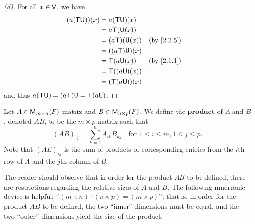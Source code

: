 \begin{proof}[(d)]
	For all \(x \in \mathsf{V}\), we have
	\begin{align*}
		(a (\T \U))(x) & = a (\T \U)(x)                   \\
		               & = a \T(\U(x))                    \\
		               & = (a \T)(\U(x))  &  & \by{2.2.5} \\
		               & = ((a \T) \U)(x)                 \\
		               & = \T(a \U(x))    &  & \by{2.1.1} \\
		               & = \T((a \U)(x))                  \\
		               & = (\T (a \U))(x)
	\end{align*}
	and thus \(a (\mathsf{T} \mathsf{U}) = (a \mathsf{T}) \mathsf{U} = \mathsf{T} (a \mathsf{U})\).
\end{proof}

\begin{defn}\label{2.3.1}
	Let \(A \in \ms\) matrix and \(B \in \ms[n][p][\F]\).
	We define the \textbf{product} of \(A\) and \(B\), denoted \(AB\), to be the \(m \times p\) matrix such that
	\[
		(AB)_{i j} = \sum_{k = 1}^n A_{i k} B_{k j} \quad \text{for } 1 \leq i \leq m, 1 \leq j \leq p.
	\]
	Note that \((AB)_{i j}\) is the sum of products of corresponding entries from the \(i\)th row of \(A\) and the \(j\)th column of \(B\).
\end{defn}

\begin{note}
	The reader should observe that in order for the product \(AB\) to be defined, there are restrictions regarding the relative sizes of \(A\) and \(B\).
	The following mnemonic device is helpful:
	``\((m \times n) \cdot (n \times p) = (m \times p)\)'';
	that is, in order for the product \(AB\) to be defined, the two ``inner'' dimensions must be equal, and the two ``outer'' dimensions yield the size of the product.
\end{note}

